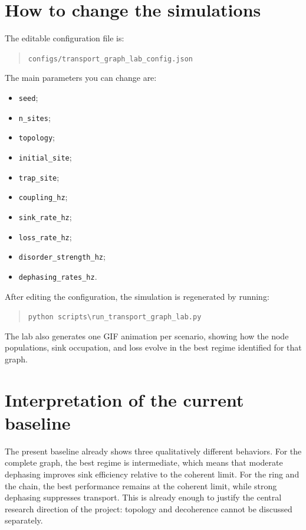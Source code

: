 \documentclass[11pt,a4paper]{article}
\begin{document}
\section{How to change the simulations}

The editable configuration file is:
\begin{quote}
\texttt{configs/transport\_graph\_lab\_config.json}
\end{quote}

The main parameters you can change are:
\begin{itemize}
  \item \texttt{seed};
  \item \texttt{n\_sites};
  \item \texttt{topology};
  \item \texttt{initial\_site};
  \item \texttt{trap\_site};
  \item \texttt{coupling\_hz};
  \item \texttt{sink\_rate\_hz};
  \item \texttt{loss\_rate\_hz};
  \item \texttt{disorder\_strength\_hz};
  \item \texttt{dephasing\_rates\_hz}.
\end{itemize}

After editing the configuration, the simulation is regenerated by running:
\begin{quote}
\texttt{python scripts\textbackslash run\_transport\_graph\_lab.py}
\end{quote}

The lab also generates one GIF animation per scenario, showing how the node
populations, sink occupation, and loss evolve in the best regime identified for
that graph.

\section{Interpretation of the current baseline}

The present baseline already shows three qualitatively different behaviors.
For the complete graph, the best regime is intermediate, which means that
moderate dephasing improves sink efficiency relative to the coherent limit.
For the ring and the chain, the best performance remains at the coherent limit,
while strong dephasing suppresses transport. This is already enough to justify
the central research direction of the project: topology and decoherence cannot
be discussed separately.



\end{document}
